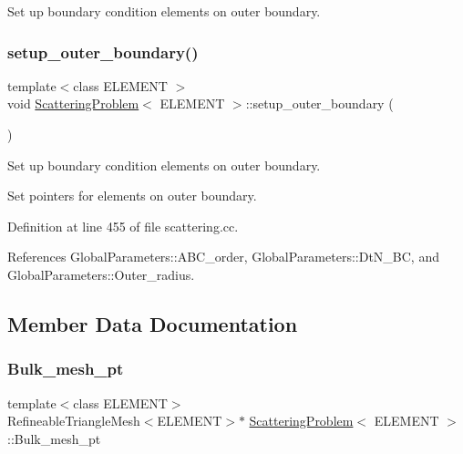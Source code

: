 Set up boundary condition elements on outer boundary. 

\mbox{\label{classScatteringProblem_a76bd8299ea7ed559681b294acfb2aad4}} 
\subsubsection{\texorpdfstring{setup\+\_\+outer\+\_\+boundary()}{setup\_outer\_boundary()}\hspace{0.1cm}{\footnotesize\ttfamily [2/2]}}
{\footnotesize\ttfamily template$<$class E\+L\+E\+M\+E\+NT $>$ \\
void \hyperlink{classScatteringProblem}{Scattering\+Problem}$<$ E\+L\+E\+M\+E\+NT $>$\+::setup\+\_\+outer\+\_\+boundary (\begin{DoxyParamCaption}{ }\end{DoxyParamCaption})}



Set up boundary condition elements on outer boundary. 

Set pointers for elements on outer boundary. 

Definition at line 455 of file scattering.\+cc.



References Global\+Parameters\+::\+A\+B\+C\+\_\+order, Global\+Parameters\+::\+Dt\+N\+\_\+\+BC, and Global\+Parameters\+::\+Outer\+\_\+radius.



\subsection{Member Data Documentation}
\mbox{\label{classScatteringProblem_aec2b62d5a05a10625ee43aab7f3c7a97}} 
\subsubsection{\texorpdfstring{Bulk\+\_\+mesh\+\_\+pt}{Bulk\_mesh\_pt}\hspace{0.1cm}{\footnotesize\ttfamily [1/4]}}
{\footnotesize\ttfamily template$<$class E\+L\+E\+M\+E\+NT$>$ \\
Refineable\+Triangle\+Mesh$<$E\+L\+E\+M\+E\+NT$>$$\ast$ \hyperlink{classScatteringProblem}{Scattering\+Problem}$<$ E\+L\+E\+M\+E\+NT $>$\+::Bulk\+\_\+mesh\+\_\+pt}



